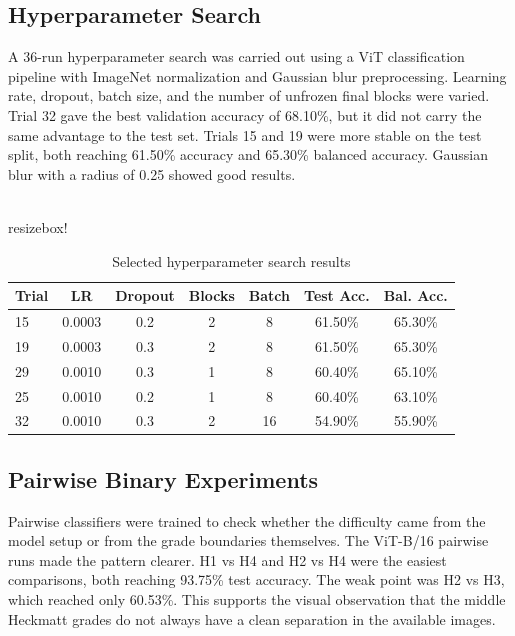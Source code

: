 \subsection{Hyperparameter Search}
A 36-run hyperparameter search was carried out using a ViT classification pipeline with ImageNet normalization and Gaussian blur preprocessing. Learning rate, dropout, batch size, and the number of unfrozen final blocks were varied. Trial 32 gave the best validation accuracy of 68.10\%, but it did not carry the same advantage to the test set. Trials 15 and 19 were more stable on the test split, both reaching 61.50\% accuracy and 65.30\% balanced accuracy. Gaussian blur with a radius of 0.25 showed good results.



\begin{table}[H]
\centering
\scriptsize
\\resizebox{\textwidth}{!}{%
\begin{tabular}{lcccccc}
\toprule
\textbf{Trial} & \textbf{LR} & \textbf{Dropout} & \textbf{Blocks} & \textbf{Batch} & \textbf{Test Acc.} & \textbf{Bal. Acc.} \\
\midrule
15 & 0.0003 & 0.2 & 2 & 8 & 61.50\% & 65.30\% \\
19 & 0.0003 & 0.3 & 2 & 8 & 61.50\% & 65.30\% \\
29 & 0.0010 & 0.3 & 1 & 8 & 60.40\% & 65.10\% \\
25 & 0.0010 & 0.2 & 1 & 8 & 60.40\% & 63.10\% \\
32 & 0.0010 & 0.3 & 2 & 16 & 54.90\% & 55.90\% \\
\bottomrule
\end{tabular}}
\caption{Selected hyperparameter search results}
\label{tab:hparam_search}
\end{table}

\subsection{Pairwise Binary Experiments}
Pairwise classifiers were trained to check whether the difficulty came from the model setup or from the grade boundaries themselves. The ViT-B/16 pairwise runs made the pattern clearer. H1 vs H4 and H2 vs H4 were the easiest comparisons, both reaching 93.75\% test accuracy. The weak point was H2 vs H3, which reached only 60.53\%. This supports the visual observation that the middle Heckmatt grades do not always have a clean separation in the available images.

